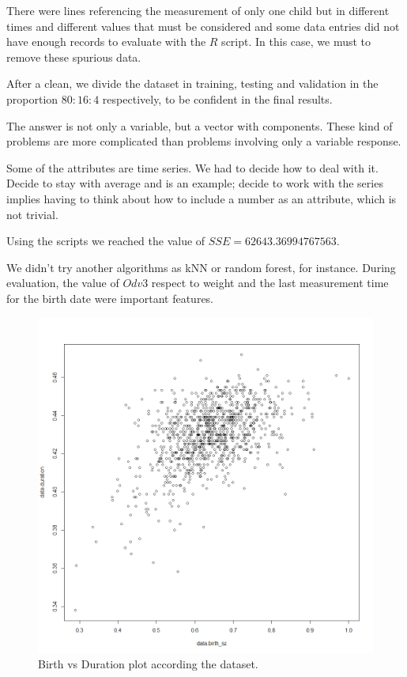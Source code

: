 \documentclass[10pt,twocolumn,letterpaper]{article}
\begin{document}
There were lines referencing the measurement of only one child but in different times and different values that must be considered and some data entries did not have enough records to evaluate with the $R$ script. In this case, we must to remove these spurious data.

After a clean, we divide the dataset in training, testing and validation in the proportion $80 : 16 : 4$ respectively, to be confident in the final results.

The answer is not only a variable, but a vector with components. These kind of problems are more complicated than problems involving only a variable response.

Some of the attributes are time series. We had to decide how to deal with it. Decide to stay with average and is an example; decide to work with the series implies having to think about how to include a number as an attribute, which is not trivial.


Using the scripts we reached the value of $SSE = 62643.36994767563$.

We didn't try another algorithms as kNN or random forest, for instance. During evaluation, the value of $Odv3$ respect to weight and the last measurement time for the birth date were important features.

\begin{figure}
\begin{center}
	\includegraphics[width=0.99\columnwidth]{pics/birth_vs_duration}
	\caption{Birth vs Duration plot according the dataset.\label{fig:birth_vs_duration}}   
\end{center} 
\end{figure}   
\end{document}
